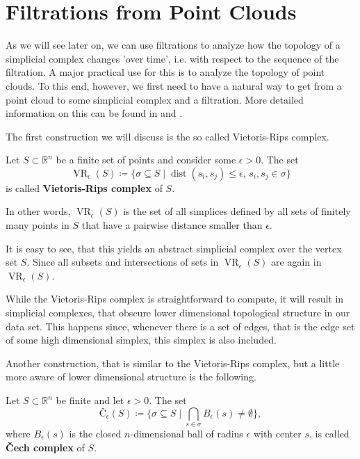 \section{Filtrations from Point Clouds}
\label{sec:filtrations_from_point_clouds}
As we will see later on, we can use filtrations to analyze how the topology of a simplicial complex changes 'over time', i.e. with respect to the sequence of the filtration. A major practical use for this is to analyze the topology of point clouds. To this end, however, we first need to have a natural way to get from a point cloud to some simplicial complex and a filtration. More detailed information on this can be found in \cite{Computational+Topology} and \cite{elementary_topology}. 

The first construction we will discuss is the so called Vietoris-Rips complex.

\begin{defi}
Let $S \subset \mathbb{R}^n$ be a finite set of points and consider some $\epsilon > 0$. The set \[
   \operatorname{VR}_\epsilon(S) \coloneqq \{\sigma \subseteq S \mid \operatorname{dist}(s_i,s_j)\leq \epsilon \text{, }s_i,s_j \in \sigma\}
\]
is called \textbf{Vietoris-Rips complex} of $S$.
\end{defi}

In other words, $\operatorname{VR}_\epsilon(S)$ is the set of all simplices defined by all sets of finitely many points in $S$ that have a pairwise distance smaller than $\epsilon$.

It is easy to see, that this yields an abstract simplicial complex over the vertex set $S$. Since all subsets and intersections of sets in $\operatorname{VR}_\epsilon(S)$ are again in $\operatorname{VR}_\epsilon(S)$.

While the Vietoris-Rips complex is straightforward to compute, it will result in simplicial complexes, that obscure lower dimensional topological structure in our data set. This happens since, whenever there is a set of edges, that is the edge set of some high dimensional simplex, this simplex is also included.

Another construction, that is similar to the Vietoris-Rips complex, but a little more aware of lower dimensional structure is the following.
\begin{defi}
Let $S \subset \mathbb{R}^n$ be finite and let $\epsilon > 0$. The set \[
    \text{\v{C}}_\epsilon(S) \coloneqq \{ \sigma \subseteq S \mid \bigcap\limits_{s \in \sigma} B_\epsilon(s) \neq \emptyset \},
\]
where $B_\epsilon(s)$ is the closed $n$-dimensional ball of radius $\epsilon$ with center $s$, is called \textbf{\v{C}ech complex} of $S$.
\end{defi}

